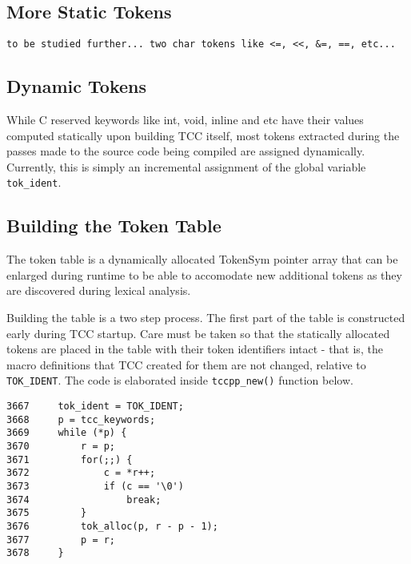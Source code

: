 \subsection{More Static Tokens}

\begin{verbatim}
to be studied further... two char tokens like <=, <<, &=, ==, etc...
\end{verbatim}


\subsection{Dynamic Tokens}

While C reserved keywords like int, void, inline and etc have their values computed statically upon building TCC itself, most tokens extracted during the passes made to the source code being compiled are assigned dynamically. Currently, this is simply an incremental assignment of the global variable \verb|tok_ident|.

\subsection{Building the Token Table}

The token table is a dynamically allocated TokenSym pointer array that can be enlarged during runtime to be able to accomodate new additional tokens as they are discovered during lexical analysis. 

Building the table is a two step process. The first part of the table is constructed early during TCC startup. Care must be taken so that the statically allocated tokens are placed in the table with their token identifiers intact - that is, the macro definitions that TCC created for them are not changed, relative to \verb|TOK_IDENT|. The code is elaborated inside \verb|tccpp_new()| function below.

\begin{verbatim}
3667     tok_ident = TOK_IDENT;
3668     p = tcc_keywords;
3669     while (*p) {
3670         r = p;
3671         for(;;) {
3672             c = *r++;
3673             if (c == '\0')
3674                 break;
3675         }
3676         tok_alloc(p, r - p - 1);
3677         p = r;
3678     }
\end{verbatim}

